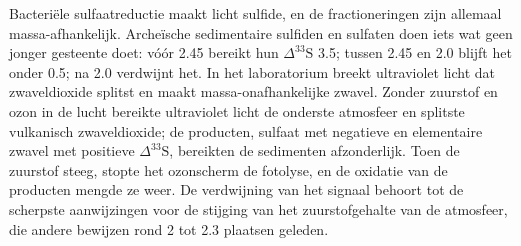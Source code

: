 Bacteriële sulfaatreductie maakt licht sulfide, en de fractioneringen zijn
allemaal massa-afhankelijk. Archeïsche sedimentaire sulfiden en sulfaten doen iets wat geen
jonger gesteente doet: vóór \qty{2.45}{\Ga} bereikt hun $\Delta^{33}\mathrm S$
\qty{3.5}{\permil}; tussen 2.45 en \qty{2.0}{\Ga} blijft het onder
\qty{0.5}{\permil}; na \qty{2.0}{\Ga} verdwijnt het. In het laboratorium
breekt ultraviolet licht dat zwaveldioxide splitst en maakt massa-onafhankelijke zwavel.
Zonder zuurstof en ozon in de lucht bereikte ultraviolet licht de onderste
atmosfeer en splitste vulkanisch zwaveldioxide; de producten, sulfaat met
negatieve en elementaire zwavel met positieve $\Delta^{33}\mathrm S$, bereikten de
sedimenten afzonderlijk. Toen de zuurstof steeg, stopte het ozonscherm de
fotolyse, en de oxidatie van de producten mengde ze weer. De
verdwijning van het signaal behoort tot de scherpste aanwijzingen voor de stijging van
het zuurstofgehalte van de atmosfeer, die andere bewijzen rond 2 tot \qty{2.3}{\Ga} plaatsen
geleden.

\begin{omfigure}

\par{}\label{fig:b3:stable-isotopes:three-isotope}
\end{omfigure}

